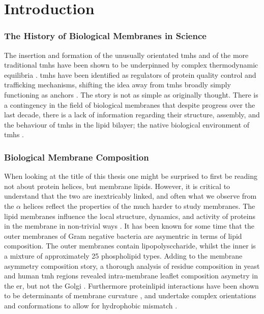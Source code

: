 \chapter{Introduction}

\subsection{The History of Biological Membranes in Science}

The insertion and formation of the unusually orientated \gls{tmh}s and of the more traditional \gls{tmh}s have been shown to be underpinned by complex thermodynamic equilibria \cite{Cymer2014}. \gls{tmh}s have been identified as regulators of protein quality control and trafficking mechanisms, shifting the idea away from \gls{tmh}s broadly simply functioning as anchors \cite{Hessa2011}. The story is not as simple as originally thought. There is a contingency in the field of biological membranes that despite progress over the last decade, there is a lack of information regarding their structure, assembly, and the behaviour of \gls{tmh}s in the lipid bilayer; the native biological environment of \gls{tmh}s \cite{Ladokhin2015, Cymer2014}.

\subsection{Biological Membrane Composition}

When looking at the title of this thesis one might be surprised to first be reading not about protein helices, but membrane lipids. However, it is critical to understand that the two are inextricably linked, and often what we observe from the $\alpha$ helices reflect the properties of the much harder to study membranes. The lipid membranes influence the local structure, dynamics, and activity of proteins in the membrane in non-trivial ways \cite{Bondar2010, Bondar2009, Jardon-Valadez2010, Kalvodova2005, Urban2005}. It has been known for some time that the outer membranes of Gram negative bacteria are asymentric in terms of lipid composition. The outer membranes contain lipopolysccharide, whilst the inner is a mixture of approximately 25 phospholipid types. Adding to the membrane asymmetry composition story, a thorough analysis of residue composition in yeast and human \gls{tmh} regions revealed intra-membrane leaflet composition asymetry in the \gls{er}, but not the Golgi \cite{Sharpe2010}. Furthermore protein\-lipid interactions have been shown to be determinants of membrane curvature \cite{Jensen2004}, and undertake complex orientations and conformations to allow for hydrophobic mismatch \cite{Planque2003}. %

